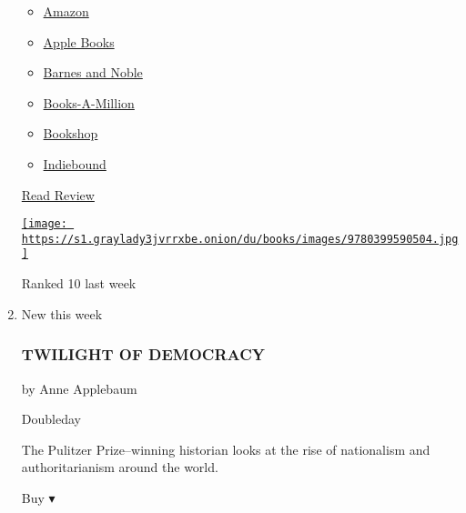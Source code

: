 \begin{enumerate}
  \begin{itemize}
  \tightlist
  \item
    \href{https://www.amazon.com/Educated-Memoir-Tara-Westover/dp/0399590501?tag=NYTBS-20}{Amazon}
  \item
    \href{https://du-gae-books-dot-nyt-du-prd.appspot.com/buy?title=EDUCATED\&author=Tara+Westover}{Apple
    Books}
  \item
    \href{https://www.anrdoezrs.net/click-7990613-11819508?url=https\%3A\%2F\%2Fwww.barnesandnoble.com\%2Fw\%2F\%3Fean\%3D9780399590504}{Barnes
    and Noble}
  \item
    \href{https://www.anrdoezrs.net/click-7990613-35140?url=https\%3A\%2F\%2Fwww.booksamillion.com\%2Fp\%2FEDUCATED\%2FTara\%2BWestover\%2F9780399590504}{Books-A-Million}
  \item
    \href{https://bookshop.org/a/3546/9780399590504}{Bookshop}
  \item
    \href{https://www.indiebound.org/book/9780399590504?aff=NYT}{Indiebound}
  \end{itemize}

  \href{https://www.nytimes3xbfgragh.onion/2018/03/01/books/review/tara-westover-educated.html}{Read
  Review}

  \href{https://www.nytimes3xbfgragh.onion/2018/03/01/books/review/tara-westover-educated.html}{\texttt{[image: https://s1.graylady3jvrrxbe.onion/du/books/images/9780399590504.jpg]}}

  Ranked 10 last week
\item
  New this week

  \hypertarget{twilight-of-democracy}{%
  \subsubsection{TWILIGHT OF DEMOCRACY}\label{twilight-of-democracy}}

  by Anne Applebaum

  Doubleday

  The Pulitzer Prize--winning historian looks at the rise of nationalism
  and authoritarianism around the world.

  Buy ▾


\end{enumerate}
